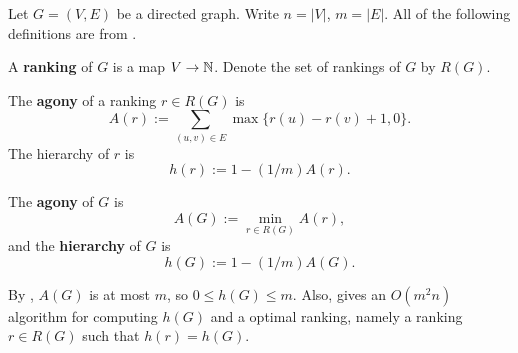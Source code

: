 \documentclass[11pt]{amsart}
\begin{document}
Let $G = (V, E)$ be a directed graph. Write $n = |V|$, $m = |E|$. All of the following definitions are from \cite{hier1}.

\begin{defn}
A {\bf ranking} of $G$ is a map $V \to \mathbb{N}$. Denote the set of rankings of $G$ by $R(G)$.
\end{defn}

\begin{defn}
The {\bf agony} of a ranking $r \in R(G)$ is
$$
A(r) := \sum_{(u, v) \in E} \max \{ r(u) - r(v) + 1, 0\}.
$$
The hierarchy of $r$ is
$$
h(r) := 1 - (1/m)A(r).
$$ 
\end{defn}

\begin{defn}
The {\bf agony} of $G$ is
$$
A(G) := \min_{r \in R(G)}A(r),
$$
and the {\bf hierarchy} of $G$ is 
$$
h(G) := 1 - (1/m)A(G).
$$
\end{defn}

By \cite{hier1}, $A(G)$ is at most $m$, so $0 \leq h(G) \leq m$. Also, \cite{hier1} gives an $O(m^2n)$ algorithm for computing $h(G)$ and a optimal ranking, namely a ranking $r \in R(G)$ such that $h(r) = h(G)$.
\end{document}
